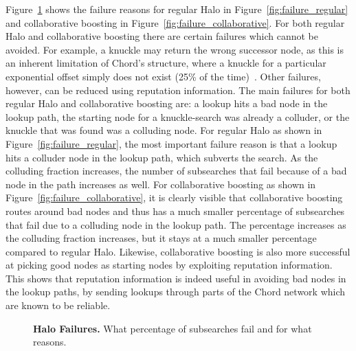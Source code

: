 Figure~\ref{fig:failure_graphs} shows the failure reasons for regular
Halo in Figure~\ref{fig:failure_regular} and collaborative boosting in
Figure~\ref{fig:failure_collaborative}. For both regular Halo and
collaborative boosting there are certain failures which cannot be
avoided.  For example, a knuckle may return the wrong successor node,
as this is an inherent limitation of Chord's structure, where a knuckle
for a particular exponential offset simply does not exist (25\% of the
time)~\cite{halo}. Other failures, however, can be reduced using
reputation information. The main failures for both regular Halo and
collaborative boosting are: a lookup hits a bad node in the lookup
path, the starting node for a knuckle-search was already a colluder, or
the knuckle that was found was a colluding node.  For regular Halo as
shown in Figure~\ref{fig:failure_regular}, the most important failure
reason is that a lookup hits a colluder node in the lookup path, which
subverts the search. As the colluding fraction increases, the number of
subsearches that fail because of a bad node in the path increases as
well.  For collaborative boosting as shown in
Figure~\ref{fig:failure_collaborative}, it is clearly visible that
collaborative boosting routes around bad nodes and thus has a much
smaller percentage of subsearches that fail due to a colluding node in
the lookup path. The percentage increases as the colluding fraction
increases, but it stays at a much smaller percentage compared to
regular Halo. Likewise, collaborative boosting is also more successful
at picking good nodes as starting nodes by exploiting reputation
information.  This shows that reputation information is indeed useful
in avoiding bad nodes in the lookup paths, by sending lookups through
parts of the Chord network which are known to be reliable.

\begin{figure}[t!]
\centering {}
\hspace{0.5cm} 
 \caption{{\bf Halo Failures.} What percentage of subsearches fail and
   for what reasons.}
      \label{fig:failure_graphs}
\end{figure}

